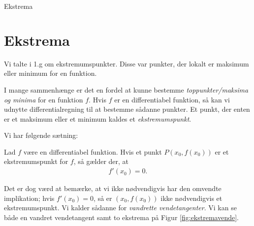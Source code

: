 \begin{center}
	\Huge
	Ekstrema
\end{center}



\section*{Ekstrema}

Vi talte i 1.g om ekstremumspunkter. Disse var punkter, der lokalt er maksimum eller minimum for en funktion. 

I mange sammenhænge er det en fordel at kunne bestemme \textit{toppunkter/maksima og minima} for en funktion $f$. Hvis $f$ er en differentiabel funktion, så kan vi udnytte differentialregning til at bestemme sådanne punkter. Et punkt, der enten er et maksimum eller et minimum kaldes et \textit{ekstremumspunkt}. 

Vi har følgende sætning:
\begin{setn}[Ekstremumspunkter]
	Lad $f$ være en differentiabel funktion. Hvis et punkt $P(x_0,f(x_0))$ er et ekstremumspunkt for $f$, så gælder der, at 
	\begin{align*}
		f'(x_0) = 0.
	\end{align*}
\end{setn}
Det er dog værd at bemærke, at vi ikke nødvendigvis har den omvendte implikation; hvis $f'(x_0)=0$, så er $(x_0,f(x_0))$ ikke nødvendigvis et ekstremumspunkt. Vi kalder sådanne for \textit{vandrette vendetangenter}. Vi kan se både en vandret vendetangent samt to ekstrema på Figur \ref{fig:ekstremavende}.


